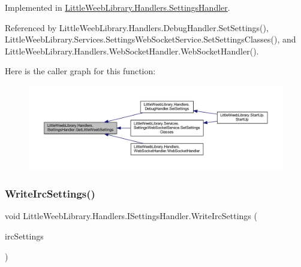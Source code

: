 Implemented in \mbox{\hyperlink{class_little_weeb_library_1_1_handlers_1_1_settings_handler_a53a5c5206eb6d2c58fa9d970c9b97463}{Little\+Weeb\+Library.\+Handlers.\+Settings\+Handler}}.



Referenced by Little\+Weeb\+Library.\+Handlers.\+Debug\+Handler.\+Set\+Settings(), Little\+Weeb\+Library.\+Services.\+Settings\+Web\+Socket\+Service.\+Set\+Settings\+Classes(), and Little\+Weeb\+Library.\+Handlers.\+Web\+Socket\+Handler.\+Web\+Socket\+Handler().

Here is the caller graph for this function\+:\nopagebreak
\begin{figure}[H]
\begin{center}
\leavevmode
\includegraphics[width=350pt]{interface_little_weeb_library_1_1_handlers_1_1_i_settings_handler_a493bc8df18211fa8c3874371b809e006_icgraph}
\end{center}
\end{figure}
\mbox{\label{interface_little_weeb_library_1_1_handlers_1_1_i_settings_handler_a0c2480bc0a0ff28ed1dc68d32817efc6}} 
\subsubsection{\texorpdfstring{Write\+Irc\+Settings()}{WriteIrcSettings()}}
{\footnotesize\ttfamily void Little\+Weeb\+Library.\+Handlers.\+I\+Settings\+Handler.\+Write\+Irc\+Settings (\begin{DoxyParamCaption}\item[{\mbox{\hyperlink{class_little_weeb_library_1_1_settings_1_1_irc_settings}{Irc\+Settings}}}]{irc\+Settings }\end{DoxyParamCaption})}



